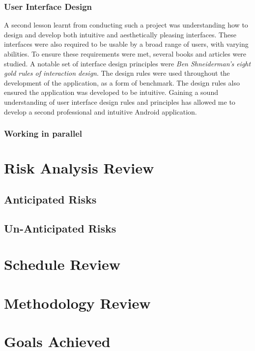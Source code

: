 \documentclass[11pt,a4paper]{report}
\begin{document}
\subsubsection{User Interface Design}
A second lesson learnt from conducting such a project was understanding how to design and develop both intuitive and aesthetically pleasing interfaces. These interfaces were also required to be usable by a broad range of users, with varying abilities. To ensure these requirements were met, several books and articles were studied. A notable set of interface design principles were \emph{Ben Shneiderman's eight gold rules of interaction design}. The design rules were used throughout the development of the application, as a form of benchmark. The design rules also ensured the application was developed to be intuitive. Gaining a sound understanding of user interface design rules and principles has allowed me to develop a second professional and intuitive Android application.   

\subsubsection{Working in parallel}

\section{Risk Analysis Review}
\label{sec:risk-analysis-review}
\subsection{Anticipated Risks}
\label{sec:anticipated-risks}
\subsection{Un-Anticipated Risks}
\label{sec:unanticipated-risks}
\section{Schedule Review}
\label{sec:schedule-review}
\section{Methodology Review}
\label{sec:methodology-review}
\section{Goals Achieved}
\label{sec:goals-achieved}
\end{document}
